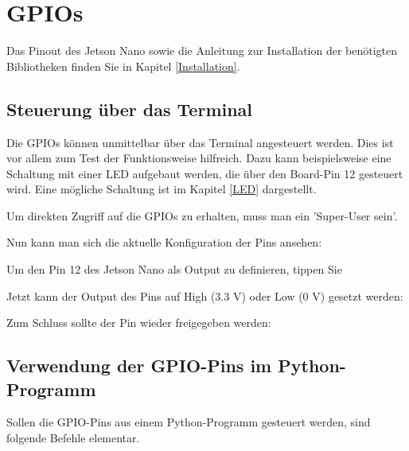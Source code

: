 \section{GPIOs} \label{GPIO}

Das Pinout des Jetson Nano sowie die Anleitung zur Installation der benötigten Bibliotheken finden Sie in Kapitel \ref{Installation}.

\subsection{Steuerung über das Terminal}
Die GPIOs können unmittelbar über das Terminal angesteuert werden. Dies ist vor allem zum Test der Funktionsweise hilfreich. Dazu kann beispielsweise eine Schaltung mit einer LED aufgebaut werden, die über den Board-Pin 12 gesteuert wird. Eine mögliche Schaltung ist im Kapitel \ref{LED} dargestellt. 

\medskip

Um direkten Zugriff auf die GPIOs zu erhalten, muss man ein 'Super-User sein'.

\medskip
{}
\medskip

Nun kann man sich die aktuelle Konfiguration der Pins ansehen:

\medskip
{}
\medskip

Um den Pin 12 des Jetson Nano als Output zu definieren, tippen Sie

\medskip
{} \newline
{}
\medskip

Jetzt kann der Output des Pins auf High (3.3 V) oder Low (0 V) gesetzt werden:

\medskip
{} \newline
{}
\medskip

Zum Schluss sollte der Pin wieder freigegeben werden:

\medskip
{}
\medskip

\subsection{Verwendung der GPIO-Pins im Python-Programm}

Sollen die GPIO-Pins aus einem Python-Programm gesteuert werden, sind folgende Befehle elementar.

